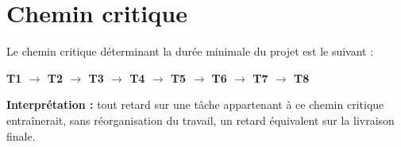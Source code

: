 \section{Chemin critique}

Le chemin critique déterminant la durée minimale du projet est le suivant :

\begin{center}
\textbf{T1 $\to$ T2 $\to$ T3 $\to$ T4 $\to$ T5 $\to$ T6 $\to$ T7 $\to$ T8}
\end{center}

\textbf{Interprétation :} tout retard sur une tâche appartenant à ce chemin critique entraînerait, sans réorganisation du travail, un retard équivalent sur la livraison finale.
